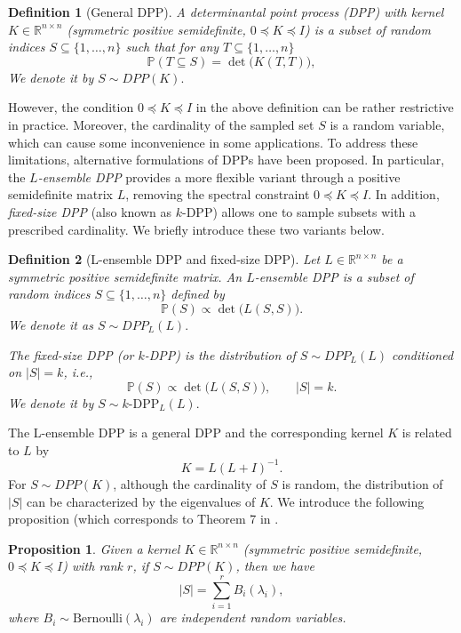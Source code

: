 \documentclass[11pt]{article}
\newtheorem{proposition}{Proposition}[section]
\newtheorem{definition}{Definition}[section]
\newcommand{\Rnn}{\mathbb{R}^{n\times n}}
\newcommand{\<}{\langle}
\renewcommand{\>}{\rangle}
\begin{document}
\begin{definition}[General DPP]
A \emph{determinantal point process (DPP)} with kernel $K\in\mathbb{R}^{n\times n}$ (symmetric positive semidefinite, $0\preceq K\preceq I$) is a subset of random indices $S\subseteq \{1,\dots,n\}$ such that for any $T\subseteq \{1,\dots,n\}$
\[
\mathbb{P}(T\subseteq S)=\det\bigl(K(T,T)\bigr),
\]
We denote it by $S \sim DPP(K).$
\end{definition}

However, the condition $0\preceq K\preceq I$ in the above definition can be rather restrictive in practice. Moreover, the cardinality of the sampled set $S$ is a random variable, which can cause some inconvenience in some applications. To address these limitations, alternative formulations of DPPs have been proposed. In particular, the \emph{$L$-ensemble DPP} provides a more flexible variant through a positive semidefinite matrix $L$, removing the spectral constraint $0\preceq K\preceq I$. In addition, \emph{fixed-size DPP} (also known as $k$-DPP) allows one to sample subsets with a prescribed cardinality. We briefly introduce these two variants below.

\begin{definition}[L-ensemble DPP and fixed-size DPP]
Let $L\in \Rnn$ be a symmetric positive semidefinite matrix. An $L$-ensemble DPP is a subset of random indices $S\subseteq \{1,\dots,n\}$ defined by
\[
\mathbb{P}(S)\propto \det\bigl(L(S,S)\bigr).
\] 
We denote it as $S \sim DPP_L(L).$

The fixed-size DPP (or $k$-DPP) is the distribution of $S\sim DPP_L(L)$ conditioned on $|S|=k$, i.e.,
\[
\mathbb{P}(S)\propto \det\bigl(L(S,S)\bigr), \qquad |S|=k.
\]
We denote it by $S \sim k\text{-}\mathrm{DPP}_L(L).$
\end{definition}

The L-ensemble DPP is a general DPP and the corresponding kernel $K$ is related to $L$ by
\[
K = L (L + I)^{-1}.
\] For $S\sim DPP(K)$, although the cardinality of $S$ is random, the distribution of $|S|$ can be characterized by the eigenvalues of $K$. We introduce the following proposition (which corresponds to Theorem 7 in \cite{BenHough2006}. 
\begin{proposition}\label{prop:size_of_s}
Given a kernel $K\in\mathbb{R}^{n\times n}$ (symmetric positive semidefinite, $0\preceq K\preceq I$) with rank $r$, if $S \sim DPP(K)$, then we have 
\[
|S| = \sum\limits_{i=1}^{r} B_i(\lambda_i),
\]
where $B_i\sim\mathrm{Bernoulli}(\lambda_i)$ are independent random variables. 
\end{proposition}
\end{document}
